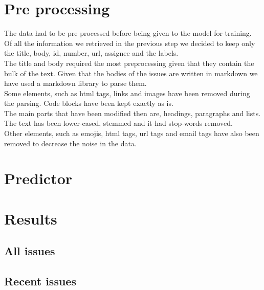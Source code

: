 \documentclass[tikz,10pt,fleqn]{article}
\begin{document}
\section*{Pre processing}
The data had to be pre processed before being given to the model for training.\\ 
Of all the information we retrieved in the previous step we decided to keep only the title, body, id, number, url, assignee and the labels.\\
The title and body required the most preprocessing given that they contain the bulk of the text.
Given that the bodies of the issues are written in markdown we have used a markdown library to parse them.\\
 Some elements, such as html tags, links and images have been removed during the parsing. Code blocks have been kept exactly as is.\\
The main parts that have been modified then are, headings, paragraphs and lists.\\
The text has been lower-cased, stemmed and it had stop-words removed.\\
Other elements, such as emojis, html tags, url tags and email tags have also been removed to decrease the noise in the data.


\section*{Predictor}


\section*{Results}
\subsection*{All issues}

\subsection*{Recent issues}
\end{document}
